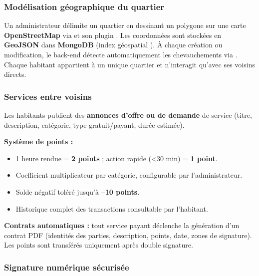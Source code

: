 \documentclass[12pt,a4paper]{article}
\begin{document}
\subsubsection{Modélisation géographique du quartier}

Un administrateur délimite un quartier en dessinant un polygone sur une carte
\textbf{Open\-Street\-Map} via  et son plugin .
Les coordonnées sont stockées en \textbf{GeoJSON} dans \textbf{MongoDB}
(index géospatial ). À chaque création ou modification, le back-end détecte automatiquement les
chevauchements via . Chaque habitant appartient à un unique
quartier et n'interagit qu'avec ses voisins directs.

\subsubsection{Services entre voisins}

Les habitants publient des \textbf{annonces d'offre ou de demande} de service
(titre, description, catégorie, type gratuit/payant, durée estimée).

\textbf{Système de points :}
\begin{itemize}
    \item 1 heure rendue = \textbf{2 points} ; action rapide (\textless{}30 min) =
          \textbf{1 point}.
    \item Coefficient multiplicateur par catégorie, configurable par l'administrateur.
    \item Solde négatif toléré jusqu'à \textbf{--10 points}.
    \item Historique complet des transactions consultable par l'habitant.
\end{itemize}

\textbf{Contrats automatiques :} tout service payant déclenche la génération d'un
contrat PDF (identités des parties, description, points, date, zones de signature).
Les points sont transférés uniquement après double signature.

\newpage

\subsubsection{Signature numérique sécurisée}
\end{document}

